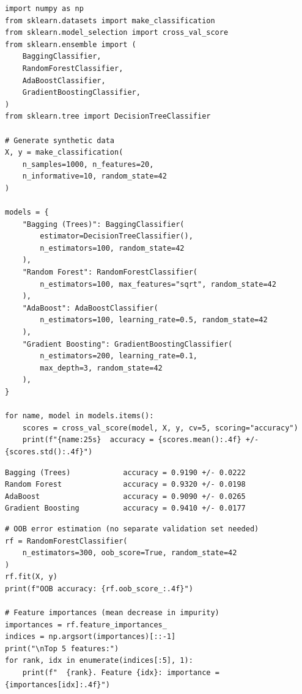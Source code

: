 \begin{codeblock}[title=\textbf{Random Forest, AdaBoost, and Gradient Boosting with scikit-learn}]
\begin{verbatim}
import numpy as np
from sklearn.datasets import make_classification
from sklearn.model_selection import cross_val_score
from sklearn.ensemble import (
    BaggingClassifier,
    RandomForestClassifier,
    AdaBoostClassifier,
    GradientBoostingClassifier,
)
from sklearn.tree import DecisionTreeClassifier

# Generate synthetic data
X, y = make_classification(
    n_samples=1000, n_features=20,
    n_informative=10, random_state=42
)

models = {
    "Bagging (Trees)": BaggingClassifier(
        estimator=DecisionTreeClassifier(),
        n_estimators=100, random_state=42
    ),
    "Random Forest": RandomForestClassifier(
        n_estimators=100, max_features="sqrt", random_state=42
    ),
    "AdaBoost": AdaBoostClassifier(
        n_estimators=100, learning_rate=0.5, random_state=42
    ),
    "Gradient Boosting": GradientBoostingClassifier(
        n_estimators=200, learning_rate=0.1,
        max_depth=3, random_state=42
    ),
}

for name, model in models.items():
    scores = cross_val_score(model, X, y, cv=5, scoring="accuracy")
    print(f"{name:25s}  accuracy = {scores.mean():.4f} +/- {scores.std():.4f}")
\end{verbatim}
\end{codeblock}

\begin{codeoutput}
\begin{verbatim}
Bagging (Trees)            accuracy = 0.9190 +/- 0.0222
Random Forest              accuracy = 0.9320 +/- 0.0198
AdaBoost                   accuracy = 0.9090 +/- 0.0265
Gradient Boosting          accuracy = 0.9410 +/- 0.0177
\end{verbatim}
\end{codeoutput}

\begin{codeblock}[title=\textbf{OOB Error and Feature Importance}]
\begin{verbatim}
# OOB error estimation (no separate validation set needed)
rf = RandomForestClassifier(
    n_estimators=300, oob_score=True, random_state=42
)
rf.fit(X, y)
print(f"OOB accuracy: {rf.oob_score_:.4f}")

# Feature importances (mean decrease in impurity)
importances = rf.feature_importances_
indices = np.argsort(importances)[::-1]
print("\nTop 5 features:")
for rank, idx in enumerate(indices[:5], 1):
    print(f"  {rank}. Feature {idx}: importance = {importances[idx]:.4f}")
\end{verbatim}
\end{codeblock}


